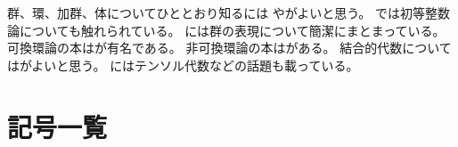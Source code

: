 \documentclass[report, notitlepage]{jlreq}
\begin{document}
群、環、加群、体についてひととおり知るには
\cite{松坂76}や\cite{Lan02}がよいと思う。
\cite{松坂76}では初等整数論についても触れられている。
\cite{AB95}には群の表現について簡潔にまとまっている。
可換環論の本は\cite{AM69}が有名である。
非可換環論の本は\cite{AF92}がある。
結合的代数については\cite{Pie82}がよいと思う。
\cite{Rot15}にはテンソル代数などの話題も載っている。

{
    \renewcommand{\bibsection}{}
    
    
}

%
\newpage
{}
{}
\part*{記号一覧}

{
    \renewcommand{\glossarysection}[2][]{}
    \printglossary[title={記号一覧}]
}

%
\newpage
{}
{}
\printindex
\end{document}
